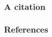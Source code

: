 \documentclass{beamer}
\begin{document}
\begin{frame}
\frametitle{A citation}
\end{frame}
\begin{frame}
\frametitle{References}

\renewcommand{\bibliographytypesize}{\tiny}

\end{frame}
\end{document}
